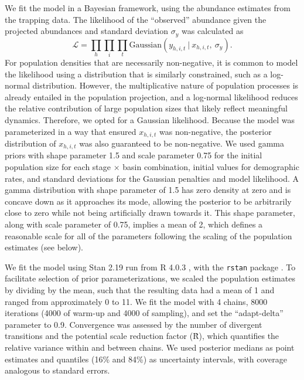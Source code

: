 \documentclass[11pt]{article}
\begin{document}
We fit the model in a Bayesian framework, 
using the abundance estimates from the trapping data. 
The likelihood of the ``observed'' abundance given the projected abundances 
and standard deviation $\sigma_y$ was calculated as
%
\begin{equation} \label{eq:likelihood}
\mathcal{L} = 
\displaystyle\prod_{h}
\displaystyle\prod_{i}
\displaystyle\prod_{t}
\text{Gaussian}
    \left(
        y_{h,i,t}~|~x_{h,i,t},~\sigma_y
    \right).
\end{equation}
%
For population densities that are necessarily non-negative, 
it is common to model the likelihood using a distribution that is similarly constrained,
such as a log-normal distribution. 
However, the multiplicative nature of population processes is already entailed 
in the population projection, 
and a log-normal likelihood reduces the relative contribution of large population sizes
that likely reflect meaningful dynamics.
Therefore, we opted for a Gaussian likelihood. 
Because the model was parameterized in a way that ensured
$x_{h,i,t}$ was non-negative,
the posterior distribution of $x_{h,i,t}$ was also guaranteed to be non-negative. 
We used gamma priors with shape parameter 1.5 and scale parameter 0.75
for the initial population size for each stage $\times$ basin combination, 
initial values for demographic rates,
and standard deviations for the Gaussian penalties and model likelihood.
A gamma distribution with shape parameter of 1.5 has zero density at zero 
and is concave down as it approaches its mode,
allowing the posterior to be arbitrarily close to zero 
while not being artificially drawn towards it.
This shape parameter, along with scale parameter of 0.75,
implies a mean of 2, 
which defines a reasonable scale for all of the parameters 
following the scaling of the population estimates (see below).

We fit the model using Stan 2.19 \citep{carpenter2017}
run from R 4.0.3 \citep{r2020}, with the \texttt{rstan} package \citep{Stan2018}.
To facilitate selection of prior parameterizations,
we scaled the population estimates by dividing by the mean,
such that the resulting data had a mean of 1
and ranged from approximately 0 to 11.
We fit the model with 4 chains, 
8000 iterations (4000 of warm-up and 4000 of sampling),
and set the ``adapt-delta'' parameter to 0.9.
Convergence was assessed by the number of divergent transitions 
and the potential scale reduction factor (\^{R}),
which quantifies the relative variance within and between chains. 
We used posterior medians as point estimates
and quantiles (16\% and 84\%) as uncertainty intervals, 
with coverage analogous to standard errors.
\end{document}
